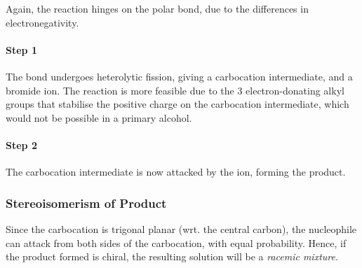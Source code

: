 			Again, the reaction hinges on the polar  bond, due to the differences in electronegativity.

			\paragraph{Step 1}


			The  bond undergoes heterolytic fission, giving a carbocation intermediate, and a bromide ion. The reaction is more
			feasible due to the 3 electron-donating alkyl groups that stabilise the positive charge on the carbocation intermediate, which
			would not be possible in a primary alcohol.

			\paragraph{Step 2}


			The carbocation intermediate is now attacked by the  ion, forming the product.


			\pagebreak
			\subsubsection{Stereoisomerism of Product}
				Since the carbocation is trigonal planar (wrt. the central carbon), the nucleophile can attack from both sides of the
				carbocation, with equal probability. Hence, if the product formed is chiral, the resulting solution will be a
				\textit{racemic mixture}.

